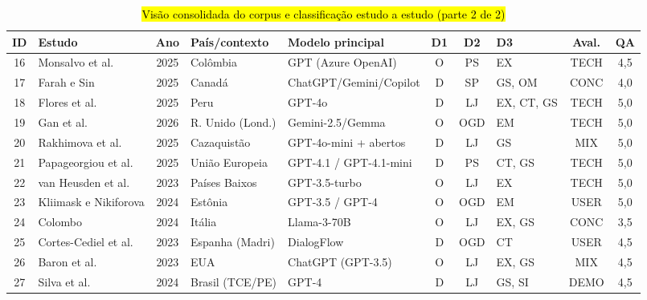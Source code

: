 \documentclass[brazilian]{sbc2025}
\newif\ifhl \hltrue
\newcommand{\rev}[1]{\ifhl\sethlcolor{yellow}\hl{#1}\else#1\fi}
\begin{document}
\begin{table}[p]
\ContinuedFloat
\centering
\caption{\rev{Visão consolidada do corpus e classificação estudo a estudo (parte 2 de 2)}}
\tiny
\begin{tabular}{|c|>{\raggedright\arraybackslash}p{2.55cm}|c|>{\raggedright\arraybackslash}p{1.65cm}|>{\raggedright\arraybackslash}p{2.2cm}|c|c|>{\raggedright\arraybackslash}p{1.4cm}|c|c|}
\hline
\textbf{ID} & \textbf{Estudo} & \textbf{Ano} & \textbf{País/contexto} & \textbf{Modelo principal} & \textbf{D1} & \textbf{D2} & \textbf{D3} & \textbf{Aval.} & \textbf{QA} \\ \hline
16 & Monsalvo et al.       & 2025 & Colômbia        & GPT (Azure OpenAI)       & O & PS  & EX       & TECH & 4,5 \\ \hline
17 & Farah e Sin           & 2025 & Canadá          & ChatGPT/Gemini/Copilot   & D & SP  & GS, OM   & CONC & 4,0 \\ \hline
18 & Flores et al.         & 2025 & Peru            & GPT-4o                    & D & LJ  & EX, CT, GS & TECH & 5,0 \\ \hline
19 & Gan et al.            & 2026 & R. Unido (Lond.)& Gemini-2.5/Gemma          & O & OGD & EM       & TECH & 5,0 \\ \hline
20 & Rakhimova et al.      & 2025 & Cazaquistão     & GPT-4o-mini + abertos     & D & LJ  & GS       & MIX  & 5,0 \\ \hline
21 & Papageorgiou et al.   & 2025 & União Europeia  & GPT-4.1 / GPT-4.1-mini   & D & PS  & CT, GS   & TECH & 5,0 \\ \hline
22 & van Heusden et al.    & 2023 & Países Baixos   & GPT-3.5-turbo             & O & LJ  & EX       & TECH & 5,0 \\ \hline
23 & Kliimask e Nikiforova & 2024 & Estônia         & GPT-3.5 / GPT-4           & O & OGD & EM       & USER & 5,0 \\ \hline
24 & Colombo               & 2024 & Itália          & Llama-3-70B               & O & LJ  & EX, GS   & CONC & 3,5 \\ \hline
25 & Cortes-Cediel et al.  & 2023 & Espanha (Madri) & DialogFlow                 & D & OGD & CT       & USER & 4,5 \\ \hline
26 & Baron et al.          & 2023 & EUA             & ChatGPT (GPT-3.5)         & O & LJ  & EX, GS   & MIX  & 4,5 \\ \hline
27 & Silva et al.          & 2024 & Brasil (TCE/PE) & GPT-4                      & D & LJ  & GS, SI   & DEMO & 4,5 \\ \hline

\end{tabular}
\end{table}
\end{document}
